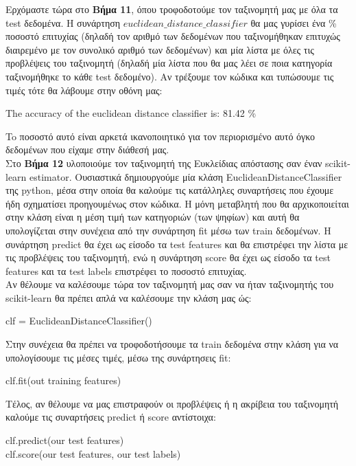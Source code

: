 \documentclass[11pt]{article} %
\begin{document}
Ερχόμαστε τώρα στο \textbf{Βήμα 11}, όπου τροφοδοτούμε τον ταξινομητή μας με όλα τα test δεδομένα. Η συνάρτηση $euclidean\_distance\_classifier$ θα μας γυρίσει ένα \% ποσοστό επιτυχίας (δηλαδή τον αριθμό των δεδομένων που ταξινομήθηκαν επιτυχώς διαιρεμένο με τον συνολικό αριθμό των δεδομένων) και μία λίστα με όλες τις προβλέψεις του ταξινομητή (δηλαδή μία λίστα που θα μας λέει σε ποια κατηγορία ταξινομήθηκε το κάθε test δεδομένο). Αν τρέξουμε τον κώδικα και τυπώσουμε τις τιμές τότε θα λάβουμε στην οθόνη μας:

\begin{center}
The accuracy of the euclidean distance classifier is: 81.42 \%
\end{center}

To ποσοστό αυτό είναι αρκετά ικανοποιητικό για τον περιορισμένο αυτό όγκο δεδομένων που είχαμε στην διάθεσή μας.\\


Στο \textbf{Βήμα 12} υλοποιούμε τον ταξινομητή της Ευκλείδιας απόστασης σαν έναν scikit-learn estimator. Ουσιαστικά δημιουργούμε μία κλάση EuclideanDistanceClassifier της python, μέσα στην οποία θα καλούμε τις κατάλληλες συναρτήσεις που έχουμε ήδη σχηματίσει προηγουμένως στον κώδικα. Η μόνη μεταβλητή που θα αρχικοποιείται στην κλάση είναι η μέση τιμή των κατηγοριών (των ψηφίων) και αυτή θα υπολογίζεται στην συνέχεια από την συνάρτηση fit μέσω των train δεδομένων. Η συνάρτηση predict θα έχει ως είσοδο τα test features και θα επιστρέφει την λίστα με τις προβλέψεις του ταξινομητή, ενώ η συνάρτηση score θα έχει ως είσοδο τα test features και τα test labels επιστρέφει το ποσοστό επιτυχίας.\\

Αν θέλουμε να καλέσουμε τώρα τον ταξινομητή μας σαν να ήταν ταξινομητής του scikit-learn θα πρέπει απλά να καλέσουμε την κλάση μας ώς:
\begin{center}
clf  = EuclideanDistanceClassifier()
\end{center}

Στην συνέχεια θα πρέπει να τροφοδοτήσουμε τα train δεδομένα στην κλάση για να υπολογίσουμε τις μέσες τιμές, μέσω της συνάρτησεις fit:
\begin{center}
clf.fit(out training features)
\end{center}

Τέλος, αν θέλουμε να μας επιστραφούν οι προβλέψεις ή η ακρίβεια του ταξινομητή καλούμε τις συναρτήσεις predict ή score αντίστοιχα:
\begin{center}
clf.predict(our test features)\\
clf.score(our test features, our test labels)
\end{center}
\end{document}

